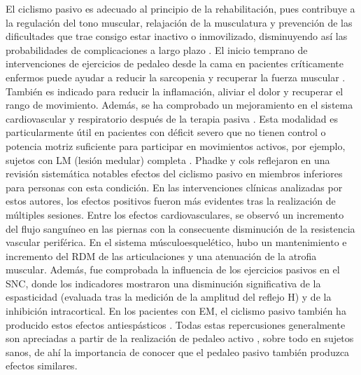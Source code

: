 El ciclismo pasivo es adecuado al principio de la rehabilitación, pues contribuye a la regulación del tono muscular, relajación de la musculatura y prevención de las dificultades que trae consigo estar inactivo o inmovilizado, disminuyendo así las probabilidades de
complicaciones a largo plazo \cite{cruz2009guia}. El inicio temprano de intervenciones de ejercicios de pedaleo desde la cama en pacientes críticamente enfermos puede ayudar a reducir la sarcopenia y recuperar la fuerza muscular \cite{nickels2020acceptability}. También es indicado para reducir la inflamación, aliviar el dolor y recuperar el rango de movimiento. Además, se ha comprobado un mejoramiento en el sistema cardiovascular y respiratorio después de la terapia pasiva \cite{cruz2009guia, phadke2019impact}.
Esta modalidad es particularmente útil en pacientes con déficit severo que no tienen control o potencia motriz suficiente para participar en movimientos activos, por ejemplo, sujetos con LM (lesión medular) completa \cite{phadke2019impact, nardone2017passive}. Phadke y cols \cite{phadke2019impact} reflejaron en una revisión sistemática notables efectos del ciclismo pasivo en miembros inferiores para personas con esta condición. En las intervenciones clínicas analizadas por estos autores, los efectos positivos fueron más evidentes tras la realización de múltiples sesiones. Entre los efectos cardiovasculares, se observó un incremento del flujo sanguíneo en las piernas con la consecuente disminución de la resistencia vascular periférica. En el sistema músculoesquelético, hubo un mantenimiento e incremento del RDM de las articulaciones y una atenuación de la atrofia muscular. Además, fue comprobada la influencia de los ejercicios pasivos en el SNC, donde los indicadores mostraron una disminución significativa de la espasticidad (evaluada tras la medición de la amplitud del reflejo H) y de la inhibición intracortical. En los pacientes con EM, el ciclismo pasivo también ha producido estos efectos antiespásticos \cite{motl2006effect, guyot2012effects}. Todas estas repercusiones generalmente son apreciadas a partir de la realización de pedaleo activo \cite{nardone2016effects}, sobre todo en sujetos sanos, de ahí la importancia de conocer que el pedaleo pasivo también produzca efectos similares.

